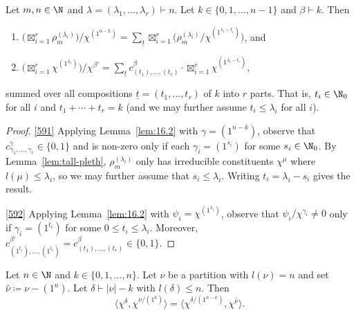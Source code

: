 \begin{corollary}\label{cor:16.2}
	Let $m,n\in\N$ and $\lambda=(\lambda_1,\dotsc,\lambda_r)\vdash n$. Let $k\in\{0,1,\dotsc,n-1\}$ and $\beta\vdash k$. Then
	\begin{enumerate}[label=\textup{(\roman*)}]
		\item \label{591} $\big(\operatorname*{\boxtimes}_{i=1}^r \rho^{(\lambda_i)}_m \big)/\chi^{(1^{n-k})} = \sum_{\underline{t}}  \operatorname*{\boxtimes}_{i=1}^r \big( \rho^{(\lambda_i)}_m/\chi^{(1^{\lambda_i-t_i})} \big)$, and
		
		\item \label{592} $\big( \operatorname*{\boxtimes}_{i=1}^r \chi^{(1^{\lambda_i})} \big)/\chi^{\beta'} = \sum_{\underline{t}} c^\beta_{(t_1),\dotsc,(t_r)}\cdot \operatorname*{\boxtimes}_{i=1}^r \chi^{(1^{\lambda_i-t_i})}$,
	\end{enumerate}
	summed over all compositions $\underline{t}=(t_1,\dotsc,t_r)$ of $k$ into $r$ parts. That is, $t_i\in\N_0$ for all $i$ and $t_1+\cdots+t_r=k$ \textup{(}and we may further assume $t_i\le\lambda_i$ for all $i$\textup{)}.
\end{corollary}

\begin{proof}
	\ref{591} Applying Lemma~\ref{lem:16.2} with $\gamma=(1^{n-k})$, observe that $c^\gamma_{\gamma_1,\dotsc,\gamma_r}\in\{0,1\}$ and is non-zero only if each $\gamma_i=(1^{s_i})$ for some $s_i\in\N_0$. By Lemma~\ref{lem:tall-pleth}, $\rho^{(\lambda_i)}_m$ only has irreducible constituents $\chi^\mu$ where $l(\mu)\le \lambda_i$, so we may further assume that $s_i\le\lambda_i$. Writing $t_i=\lambda_i-s_i$ gives the result.
	
	\noindent \ref{592} Applying Lemma~\ref{lem:16.2} with $\psi_i=\chi^{(1^{\lambda_i})}$, observe that $\psi_i/\chi^{\gamma_i}\ne 0$ only if $\gamma_i=(1^{t_i})$ for some $0\le t_i\le \lambda_i$. Moreover, $c^{\beta'}_{(1^{t_1}),\dotsc,(1^{t_r})}=c^\beta_{(t_1),\dotsc,(t_r)}\in\{0,1\}$.
\end{proof}

\begin{lemma}\label{lem:16.3}
	Let $n\in\N$ and $k\in\{0,1,\dotsc,n\}$. Let $\nu$ be a partition with $l(\nu)=n$ and set $\hat{\nu}\coloneqq \nu-(1^n)$. Let $\delta\vdash|\nu|-k$ with $l(\delta)\le n$. Then
	\[ \langle\chi^\delta,\chi^{\nu/(1^k)} \rangle = \langle \chi^{\delta/(1^{n-k})},\chi^{\hat{\nu}}\rangle. \]
\end{lemma}

